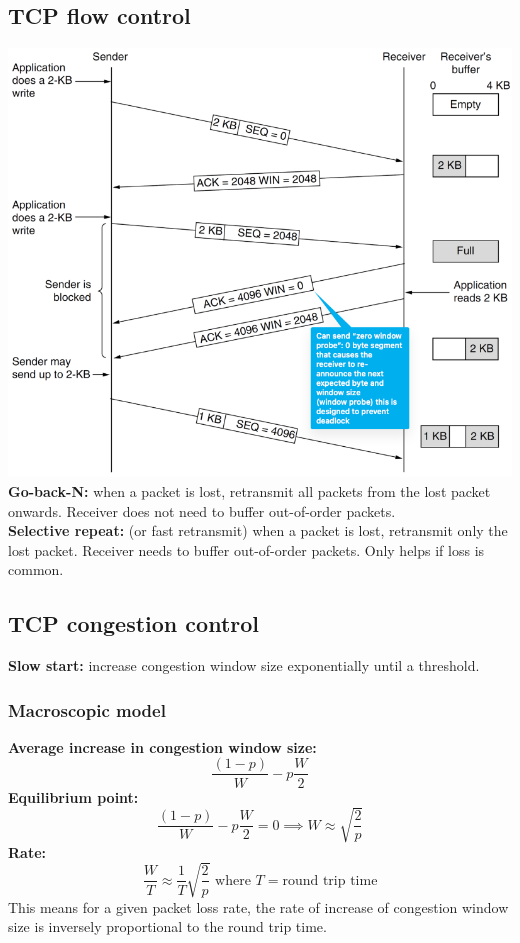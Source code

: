 \subsection{TCP flow control}
\includegraphics[width=\linewidth]{figs/tcp-sliding-window.png}
\textbf{Go-back-N:} when a packet is lost, retransmit all packets from the lost packet onwards. Receiver does not need to buffer out-of-order packets.\\
\textbf{Selective repeat:} (or fast retransmit) when a packet is lost, retransmit only the lost packet. Receiver needs to buffer out-of-order packets. Only helps if loss is common.\\

\subsection{TCP congestion control}
\textbf{Slow start:} increase congestion window size exponentially until a threshold.\\

\subsubsection{Macroscopic model}
\textbf{Average increase in congestion window size:} $$\frac{(1-p)}{W} - p \frac{W}{2}$$
\textbf{Equilibrium point:} $$\frac{(1-p)}{W} - p \frac{W}{2} = 0 \implies W \approx \sqrt{\frac{2}{p}}$$
\textbf{Rate:} $$\frac{W}{T} \approx \frac{1}{T} \sqrt{\frac{2}{p}} \text{ where } T = \text{round trip time}$$
This means for a given packet loss rate, the rate of increase of congestion window size is inversely proportional to the round trip time.\\

